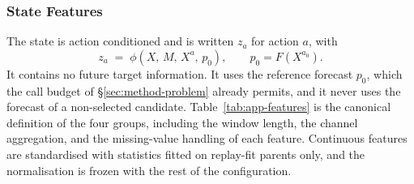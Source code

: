 \documentclass{article}
\begin{document}
\subsubsection{State Features}
\label{app:features}
The state is action conditioned and is written $z_a$ for action $a$, with
\begin{equation}
  z_a \;=\; \phi\!\left(X,\, M,\, X^{a},\, p_0\right),
  \qquad p_0 = F(X^{a_0}) .
  \label{eq:app-state}
\end{equation}
It contains no future target information. It uses the reference forecast $p_0$, which the
call budget of \S\ref{sec:method-problem} already permits, and it never uses the forecast of a
non-selected candidate. Table~\ref{tab:app-features} is the canonical definition of the four
groups, including the window length, the channel aggregation, and the missing-value handling
of each feature. Continuous features are standardised with statistics fitted on replay-fit
parents only, and the normalisation is frozen with the rest of the configuration.
\end{document}

